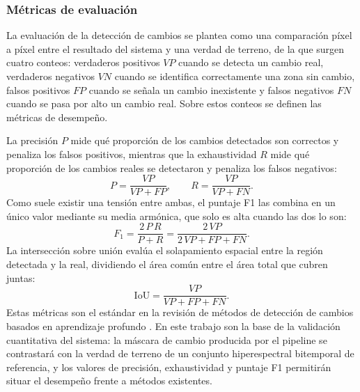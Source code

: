 \documentclass[12pt,onecolumn]{IEEEtran}
\begin{document}
\subsubsection{Métricas de evaluación}
La evaluación de la detección de cambios se plantea como una comparación píxel a píxel entre el resultado del sistema y una verdad de terreno, de la que surgen cuatro conteos: verdaderos positivos $VP$ cuando se detecta un cambio real, verdaderos negativos $VN$ cuando se identifica correctamente una zona sin cambio, falsos positivos $FP$ cuando se señala un cambio inexistente y falsos negativos $FN$ cuando se pasa por alto un cambio real. Sobre estos conteos se definen las métricas de desempeño.

La precisión $P$ mide qué proporción de los cambios detectados son correctos y penaliza los falsos positivos, mientras que la exhaustividad $R$ mide qué proporción de los cambios reales se detectaron y penaliza los falsos negativos:
\begin{equation}
P=\frac{VP}{VP+FP},\qquad R=\frac{VP}{VP+FN}.
\end{equation}
Como suele existir una tensión entre ambas, el puntaje F1 las combina en un único valor mediante su media armónica, que solo es alta cuando las dos lo son:
\begin{equation}
F_1=\frac{2\,P\,R}{P+R}=\frac{2\,VP}{2\,VP+FP+FN}.
\end{equation}
La intersección sobre unión evalúa el solapamiento espacial entre la región detectada y la real, dividiendo el área común entre el área total que cubren juntas:
\begin{equation}
\mathrm{IoU}=\frac{VP}{VP+FP+FN}.
\end{equation}
Estas métricas son el estándar en la revisión de métodos de detección de cambios basados en aprendizaje profundo \cite{khelifi2020deep}. En este trabajo son la base de la validación cuantitativa del sistema: la máscara de cambio producida por el pipeline se contrastará con la verdad de terreno de un conjunto hiperespectral bitemporal de referencia, y los valores de precisión, exhaustividad y puntaje F1 permitirán situar el desempeño frente a métodos existentes.
\end{document}
